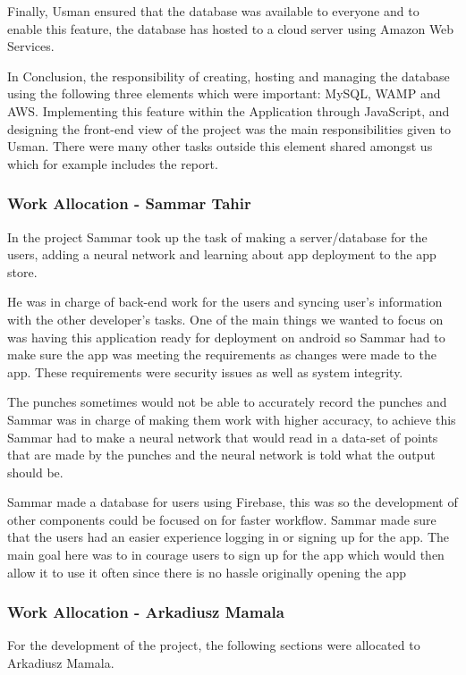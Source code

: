 \documentclass[a4paper,12pt]{report}
\begin{document}
Finally, Usman ensured that the database was available to everyone and to enable this feature, the database has hosted to a cloud server using Amazon Web Services.

In Conclusion, the responsibility of creating, hosting and managing the database using the following three elements which were important: MySQL, WAMP and AWS. Implementing this feature within the Application through JavaScript, and designing the front-end view of the project was the main responsibilities given to Usman. There were many other tasks outside this element shared amongst us which for example includes the report.

\newpage
\subsubsection{Work Allocation - Sammar Tahir}
In the project Sammar took up the task of making a server/database for the users, adding a neural network and learning about app deployment to the app store.

He was in charge of back-end work for the users and syncing user's information with the other developer's tasks. One of the main things we wanted to focus on was having this application ready for deployment on android so Sammar had to make sure the app was meeting the requirements as changes were made to the app. These requirements were security issues as well as system integrity.

The punches sometimes would not be able to accurately record the punches and Sammar was in charge of making them work with higher accuracy, to achieve this Sammar had to make a neural network that would read in a data-set of points that are made by the punches and the neural network is told what the output should be.

Sammar made a database for users using Firebase, this was so the development of other components could be focused on for faster workflow. Sammar made sure that the users had an easier experience logging in or signing up for the app. The main goal here was to in courage users to sign up for the app which would then allow it to use it often since there is no hassle originally opening the app
\newpage
\subsubsection{Work Allocation - Arkadiusz Mamala}
For the development of the project, the following sections were allocated to Arkadiusz Mamala.
\end{document}
